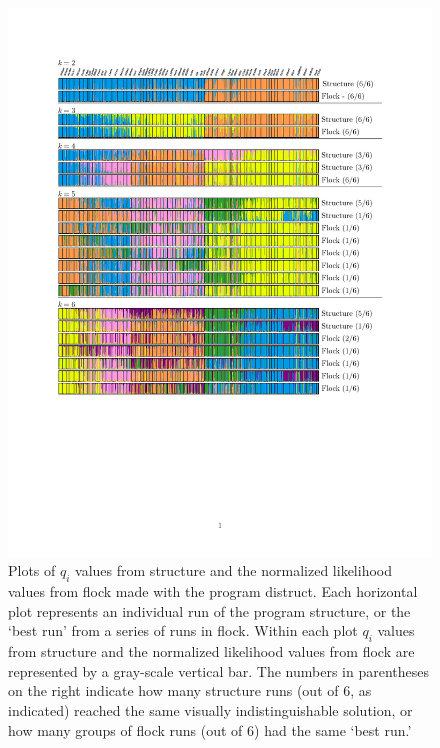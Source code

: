 \begin{figure}
\begin{center}
    \includegraphics[width=\textwidth]{images/Figures-Pat/Flock-Fig1.pdf}   %
    \caption{Plots of $q_i$ values from {\sc structure} and the normalized likelihood values 
from {\sc flock} made with the program {\sc distruct}. Each horizontal plot represents an individual run of the program {\sc structure}, or the `best run' from a series of runs in {\sc flock}. Within each plot 
$q_i$ values from {\sc structure} and the normalized likelihood values 
from {\sc flock}  are represented by a 
gray-scale vertical bar. The numbers in parentheses on the right indicate how many {\sc structure} runs (out of 6, as indicated) reached the same visually indistinguishable solution, or how many groups of {\sc flock} runs (out of 6) had the same `best run.'}
    \label{fig:qplots}
\end{center}
\end{figure}


